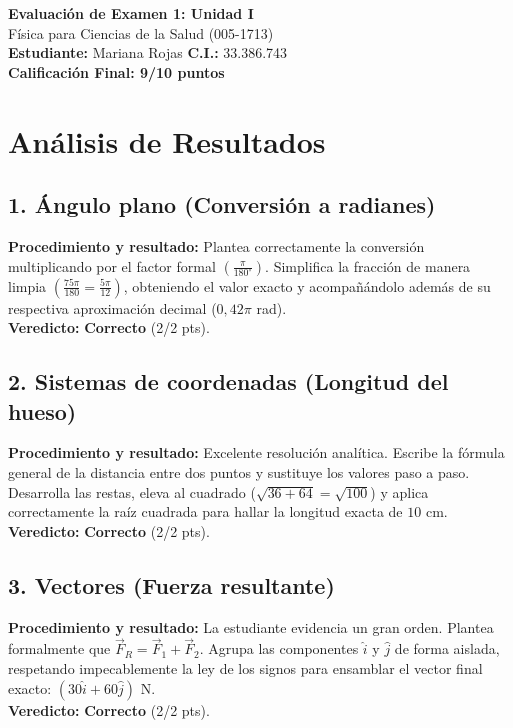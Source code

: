 \documentclass[12pt]{article}
\begin{document}
\begin{center}
    \Large \textbf{Evaluación de Examen 1: Unidad I} \\
    \large Física para Ciencias de la Salud (005-1713) \\
    \vspace{0.5cm}
    \textbf{Estudiante:} Mariana Rojas \quad \textbf{C.I.:} 33.386.743
    \vspace{0.3cm} \\
    \large \textbf{Calificación Final: 9/10 puntos}
\end{center}

\vspace{0.5cm}

\section*{Análisis de Resultados}

\subsection*{1. Ángulo plano (Conversión a radianes)}
\textbf{Procedimiento y resultado:} Plantea correctamente la conversión multiplicando por el factor formal $\left(\frac{\pi}{180^\circ}\right)$. Simplifica la fracción de manera limpia $\left(\frac{75\pi}{180} = \frac{5\pi}{12}\right)$, obteniendo el valor exacto y acompañándolo además de su respectiva aproximación decimal ($0,42\pi$ rad). \\
\textbf{Veredicto:} \textbf{Correcto} (2/2 pts).

\subsection*{2. Sistemas de coordenadas (Longitud del hueso)}
\textbf{Procedimiento y resultado:} Excelente resolución analítica. Escribe la fórmula general de la distancia entre dos puntos y sustituye los valores paso a paso. Desarrolla las restas, eleva al cuadrado ($\sqrt{36+64} = \sqrt{100}$) y aplica correctamente la raíz cuadrada para hallar la longitud exacta de $10$ cm. \\
\textbf{Veredicto:} \textbf{Correcto} (2/2 pts).

\subsection*{3. Vectores (Fuerza resultante)}
\textbf{Procedimiento y resultado:} La estudiante evidencia un gran orden. Plantea formalmente que $\vec{F}_R = \vec{F}_1 + \vec{F}_2$. Agrupa las componentes $\hat{i}$ y $\hat{j}$ de forma aislada, respetando impecablemente la ley de los signos para ensamblar el vector final exacto: $(30\hat{i} + 60\hat{j})$ N. \\
\textbf{Veredicto:} \textbf{Correcto} (2/2 pts).
\end{document}
